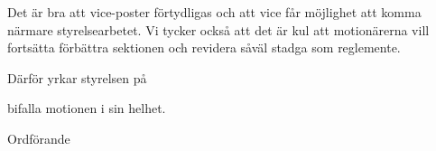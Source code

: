 \documentclass[../_main/handlingar.tex]{subfiles}
\begin{document}
\motionssvar

Det är bra att vice-poster förtydligas och att vice får möjlighet att komma närmare styrelsearbetet.
Vi tycker också att det är kul att motionärerna vill fortsätta förbättra sektionen och revidera såväl stadga som reglemente.

Därför yrkar styrelsen på 
\begin{attsatser}
    \att bifalla motionen i sin helhet.
\end{attsatser}

\begin{signatures}{1}
    \ist
    \signature{Daniel Bakic}{Ordförande}
\end{signatures}
\end{document}
